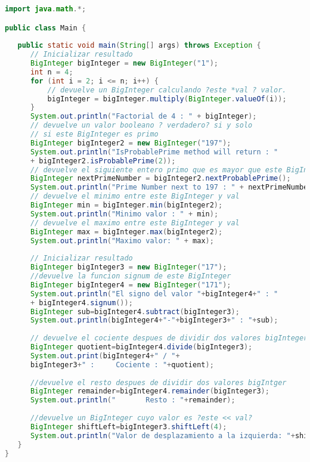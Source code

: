 \begin{lstlisting}[language=Java]
import java.math.*;

public class Main {
	
   public static void main(String[] args) throws Exception {
      // Inicializar resultado
      BigInteger bigInteger = new BigInteger("1");
      int n = 4;
      for (int i = 2; i <= n; i++) {
          // devuelve un BigInteger calculando ?este *val ? valor.
          bigInteger = bigInteger.multiply(BigInteger.valueOf(i));
      }
      System.out.println("Factorial de 4 : " + bigInteger);
      // devuelve un valor booleano ? verdadero? si y solo 
      // si este BigInteger es primo
      BigInteger bigInteger2 = new BigInteger("197");
      System.out.println("IsProbablePrime method will return : " 
      + bigInteger2.isProbablePrime(2));
      // devuelve el siguiente entero primo que es mayor que este BigInteger.
      BigInteger nextPrimeNumber = bigInteger2.nextProbablePrime();
      System.out.println("Prime Number next to 197 : " + nextPrimeNumber);
      // devuelve el minimo entre este BigInteger y val
      BigInteger min = bigInteger.min(bigInteger2);
      System.out.println("Minimo valor : " + min);
      // devuelve el maximo entre este BigInteger y val
      BigInteger max = bigInteger.max(bigInteger2);
      System.out.println("Maximo valor: " + max);
		
      // Inicializar resultado 
      BigInteger bigInteger3 = new BigInteger("17");  
      //devuelve la funcion signum de este BigInteger  
      BigInteger bigInteger4 = new BigInteger("171");  
      System.out.println("El signo del valor "+bigInteger4+" : "
      + bigInteger4.signum());  
      BigInteger sub=bigInteger4.subtract(bigInteger3);  
      System.out.println(bigInteger4+"-"+bigInteger3+" : "+sub);  
		
      // devuelve el cociente despues de dividir dos valores bigInteger 
      BigInteger quotient=bigInteger4.divide(bigInteger3);  
      System.out.print(bigInteger4+" / "+
      bigInteger3+" :     Cociente : "+quotient);  
		
      //devuelve el resto despues de dividir dos valores bigIntger  
      BigInteger remainder=bigInteger4.remainder(bigInteger3);  
      System.out.println("       Resto : "+remainder);  
		
      //devuelve un BigInteger cuyo valor es ?este << val? 
      BigInteger shiftLeft=bigInteger3.shiftLeft(4);  
      System.out.println("Valor de desplazamiento a la izquierda: "+shiftLeft);  
   }
}
\end{lstlisting}